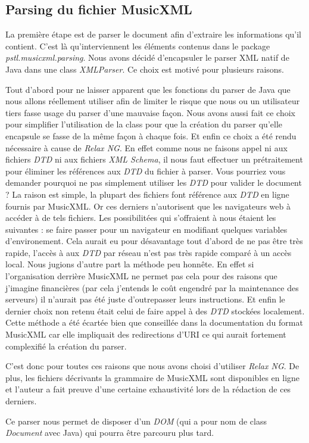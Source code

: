 \subsection{Parsing du fichier MusicXML}
\par
La première étape est de parser le document afin d'extraire les informations qu'il
contient. C'est là qu'interviennent les éléments contenus dans le package
\emph{pstl.musicxml.parsing}. Nous avons décidé d'encapsuler le parser XML natif
de Java dans une class \emph{XMLParser}. Ce choix est motivé pour plusieurs raisons.
\par
Tout d'abord pour ne laisser apparent que les fonctions du parser de Java que
nous allons réellement utiliser afin de limiter le risque que nous ou un utilisateur
tiers fasse usage du parser d'une mauvaise façon. Nous avons aussi fait ce choix pour simplifier
l'utilisation de la class pour que la création du parser qu'elle encapsule se fasse de la même façon à chaque fois.
 Et enfin ce choix a été rendu nécessaire à cause de \emph{Relax NG}. En effet comme nous
ne faisons appel ni aux fichiers \emph{DTD} ni aux fichiers \emph{XML Schema}, il nous
faut effectuer un prétraitement pour éliminer les références aux \emph{DTD} du
fichier à parser. Vous pourriez vous demander pourquoi ne pas simplement
utiliser les \emph{DTD} pour valider le document ? La raison est simple,
la plupart des fichiers font référence aux \emph{DTD} en ligne fournis par
MusicXML. Or ces derniers n'autorisent que les navigateurs web à accéder à de tels
fichiers. Les possibilitées qui s'offraient à nous étaient les suivantes : se faire
passer pour un navigateur en modifiant quelques variables d'environement. Cela
aurait eu pour désavantage tout d'abord de ne pas être très rapide, l'accès à
aux \emph{DTD} par réseau n'est pas très rapide comparé à un accès local.
Nous jugions d'autre part la méthode peu honnête. En effet si l'organisation derrière MusicXML
ne permet pas cela pour des raisons que j'imagine financières (par cela j'entends le coût engendré par la maintenance des serveurs)
 il n'aurait pas été juste d'outrepasser leurs instructions. Et enfin le dernier choix non retenu était celui de faire appel
à des \emph{DTD} stockées localement. Cette méthode a été écartée bien que conseillée
dans la documentation du format MusicXML car elle impliquait des redirections d'URI
ce qui aurait fortement complexifié la création du parser.
\par %
C'est donc pour toutes ces raisons que nous avons choisi d'utiliser \emph{Relax NG}.
De plus, les fichiers décrivants la grammaire de MusicXML sont disponibles en ligne
et l'auteur a fait preuve d'une certaine exhaustivité lors de la rédaction de ces derniers.
\par
Ce parser nous permet de disposer d'un \emph{DOM} (qui a pour nom de class \emph{Document} avec Java)
qui pourra être parcouru plus tard.

